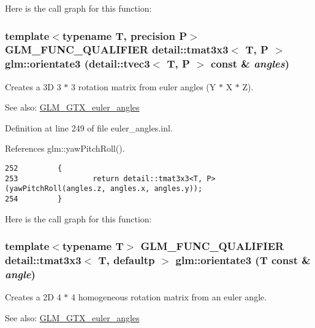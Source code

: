 Here is the call graph for this function:\hypertarget{group__gtx__euler__angles_g114ce533cc2f140cb17ca5a44214d973}{
\subsubsection[orientate3]{\setlength{\rightskip}{0pt plus 5cm}template$<$typename T, precision P$>$ GLM\_\-FUNC\_\-QUALIFIER detail::tmat3x3$<$ T, P $>$ glm::orientate3 (detail::tvec3$<$ T, P $>$ const \& {\em angles})}}
\label{group__gtx__euler__angles_g114ce533cc2f140cb17ca5a44214d973}


Creates a 3D 3 $\ast$ 3 rotation matrix from euler angles (Y $\ast$ X $\ast$ Z). \begin{Desc}
\item[See also:]\hyperlink{group__gtx__euler__angles}{GLM\_\-GTX\_\-euler\_\-angles} \end{Desc}


Definition at line 249 of file euler\_\-angles.inl.

References glm::yawPitchRoll().

\begin{Code}\begin{verbatim}252         {
253                 return detail::tmat3x3<T, P>(yawPitchRoll(angles.z, angles.x, angles.y));
254         }
\end{verbatim}
\end{Code}




Here is the call graph for this function:\hypertarget{group__gtx__euler__angles_gce794db535af3056d97f4f62e7ed7509}{
\subsubsection[orientate3]{\setlength{\rightskip}{0pt plus 5cm}template$<$typename T$>$ GLM\_\-FUNC\_\-QUALIFIER detail::tmat3x3$<$ T, defaultp $>$ glm::orientate3 (T const \& {\em angle})}}
\label{group__gtx__euler__angles_gce794db535af3056d97f4f62e7ed7509}


Creates a 2D 4 $\ast$ 4 homogeneous rotation matrix from an euler angle. \begin{Desc}
\item[See also:]\hyperlink{group__gtx__euler__angles}{GLM\_\-GTX\_\-euler\_\-angles} \end{Desc}


